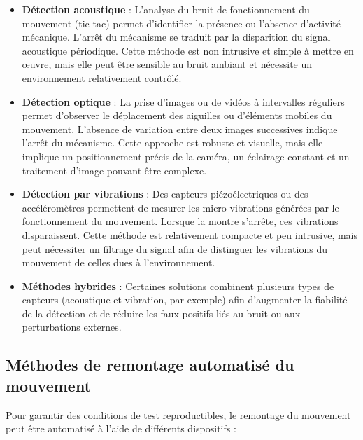 \begin{itemize}
    \item \textbf{Détection acoustique} :  
    L’analyse du bruit de fonctionnement du mouvement (tic-tac) permet d’identifier la présence ou l’absence d’activité mécanique. L’arrêt du mécanisme se traduit par la disparition du signal acoustique périodique. Cette méthode est non intrusive et simple à mettre en œuvre, mais elle peut être sensible au bruit ambiant et nécessite un environnement relativement contrôlé.

    \item \textbf{Détection optique} :  
    La prise d’images ou de vidéos à intervalles réguliers permet d’observer le déplacement des aiguilles ou d’éléments mobiles du mouvement. L’absence de variation entre deux images successives indique l’arrêt du mécanisme. Cette approche est robuste et visuelle, mais elle implique un positionnement précis de la caméra, un éclairage constant et un traitement d’image pouvant être complexe.

    \item \textbf{Détection par vibrations} :  
    Des capteurs piézoélectriques ou des accéléromètres permettent de mesurer les micro-vibrations générées par le fonctionnement du mouvement. Lorsque la montre s’arrête, ces vibrations disparaissent. Cette méthode est relativement compacte et peu intrusive, mais peut nécessiter un filtrage du signal afin de distinguer les vibrations du mouvement de celles dues à l’environnement.

    \item \textbf{Méthodes hybrides} :  
    Certaines solutions combinent plusieurs types de capteurs (acoustique et vibration, par exemple) afin d’augmenter la fiabilité de la détection et de réduire les faux positifs liés au bruit ou aux perturbations externes.
\end{itemize}

\subsection{Méthodes de remontage automatisé du mouvement}

Pour garantir des conditions de test reproductibles, le remontage du mouvement peut être automatisé à l’aide de différents dispositifs :

